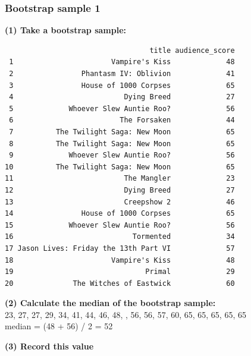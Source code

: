 \documentclass[slidestop,compress,mathserif,12pt,t,professionalfonts,xcolor=table]{beamer}
\begin{document}
\begin{frame}[fragile]
\frametitle{Bootstrap sample 1}

{\small \textbf{(1) Take a bootstrap sample:}}
\pause
{\tiny
\begin{verbatim}
                                  title audience_score
 1                       Vampire's Kiss             48
 2                Phantasm IV: Oblivion             41
 3                House of 1000 Corpses             65
 4                          Dying Breed             27
 5             Whoever Slew Auntie Roo?             56
 6                         The Forsaken             44
 7          The Twilight Saga: New Moon             65
 8          The Twilight Saga: New Moon             65
 9             Whoever Slew Auntie Roo?             56
10          The Twilight Saga: New Moon             65
11                          The Mangler             23
12                          Dying Breed             27
13                          Creepshow 2             46
14                House of 1000 Corpses             65
15             Whoever Slew Auntie Roo?             56
16                            Tormented             34
17 Jason Lives: Friday the 13th Part VI             57
18                       Vampire's Kiss             48
19                               Primal             29
20              The Witches of Eastwick             60
\end{verbatim}
}

\pause

{\small \textbf{(2) Calculate the median of the bootstrap sample:}} \\
\pause
{\footnotesize
23, 27, 27, 29, 34, 41, 44, 46, 48, , 56, 56, 57, 60, 65, 65, 65, 65, 65 \\
median = (48 + 56) / 2 = 52 \\
}

\pause

{\small
\textbf{(3) Record this value}
}

\end{frame}

\end{document}
